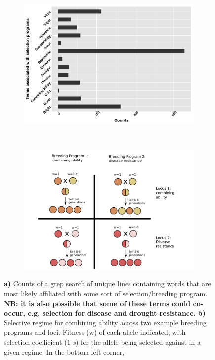 \documentclass[draft,12pt]{article}
\begin{document}
\begin{figure}[h]
        \centering
        \begin{subfigure}[b]{0.55\textwidth}
                \includegraphics[width=\textwidth]{disease.pdf}
                \caption{}
                \label{fig:words}
        \end{subfigure}%
        ~ %
        \begin{subfigure}[b]{0.55\textwidth}
                \includegraphics[width=\textwidth]{alleles_divergent.pdf}
                \caption{}
                \label{fig:div}
        \end{subfigure}
\caption{\textbf{a)} Counts of a grep search of unique lines containing words that are most likely affiliated with some sort of selection/breeding program. \textbf{NB: it is also possible that some of these terms could co-occur, e.g. selection for disease and drought resistance.} \textbf{b)} Selective regime for combining ability across two example breeding programs and loci. Fitness (w) of each allele indicated, with selection coefficient (1-\textit{s}) for the allele being selected against in a given regime. In the bottom left corner, }
\end{figure}
\end{document}
